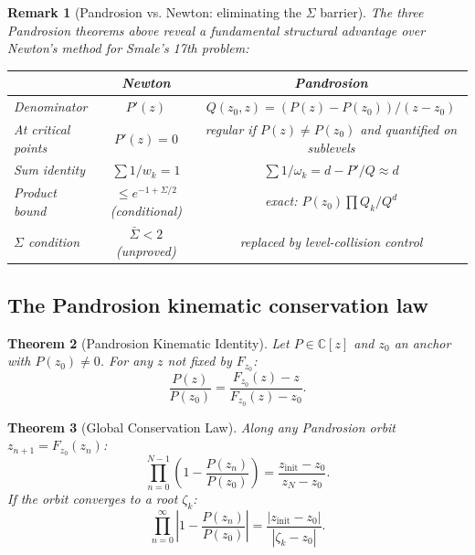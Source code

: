 \documentclass[11pt,a4paper]{article}
\newtheorem{theorem}{Theorem}[section]
\newtheorem{remark}[theorem]{Remark}
\begin{document}
\begin{remark}[Pandrosion vs. Newton: eliminating the $\Sigma$ barrier]
The three Pandrosion theorems above reveal a fundamental structural advantage over Newton's method for Smale's 17th problem:
\begin{center}
\begin{tabular}{lcc}
\toprule
                  & \textbf{Newton} & \textbf{Pandrosion} \\
\midrule
Denominator       & $P'(z)$ & $Q(z_0, z) = (P(z) - P(z_0))/(z - z_0)$ \\
At critical points & $P'(z) = 0$ & regular if $P(z)\ne P(z_0)$ and quantified on sublevels \\
Sum identity      & $\sum 1/w_k = 1$ & $\sum 1/\omega_k = d - P'/Q \approx d$ \\
Product bound     & $\le e^{-1 + \Sigma/2}$ (conditional) & exact: $P(z_0) \prod Q_k/Q^d$ \\
$\Sigma$ condition & $\bar\Sigma < 2$ (unproved) & replaced by level-collision control \\
\bottomrule
\end{tabular}
\end{center}
\end{remark}

\subsection{The Pandrosion kinematic conservation law}

\begin{theorem}[Pandrosion Kinematic Identity]
Let $P \in \mathbb{C}[z]$ and $z_0$ an anchor with $P(z_0) \ne 0$. For any $z$ not fixed by $F_{z_0}$:
\begin{equation}
\frac{P(z)}{P(z_0)} = \frac{F_{z_0}(z) - z}{F_{z_0}(z) - z_0}.
\end{equation}
\end{theorem}

\begin{theorem}[Global Conservation Law]
Along any Pandrosion orbit $z_{n+1} = F_{z_0}(z_n)$:
\begin{equation}
\prod_{n=0}^{N-1} \left(1 - \frac{P(z_n)}{P(z_0)}\right) = \frac{z_{\mathrm{init}} - z_0}{z_N - z_0}.
\end{equation}
If the orbit converges to a root $\zeta_k$:
\begin{equation}
\prod_{n=0}^\infty \left|1 - \frac{P(z_n)}{P(z_0)}\right| = \frac{|z_{\mathrm{init}} - z_0|}{|\zeta_k - z_0|}.
\end{equation}
\end{theorem}
\end{document}
